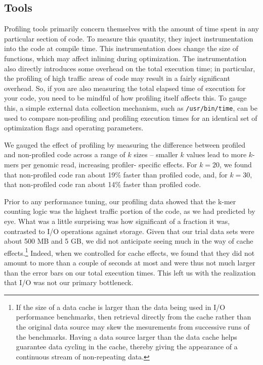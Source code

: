 \documentclass{article}
\begin{document}
\subsection{Tools}

Profiling tools primarily concern themselves with the amount of time spent in
any particular section of code. To measure this quantity, they inject
instrumentation into the code at compile time. This instrumentation does change
the size of functions, which may affect inlining during optimization.  The
instrumentation also directly introduces some overhead on the total execution
time; in particular, the profiling of high traffic areas of code may result in
a fairly significant overhead. So, if you are also measuring the total elapsed
time of execution for your code, you need to be mindful of how profiling itself
affects this. To gauge this, a simple external data collection mechanism, such
as \texttt{/usr/bin/time}, can be used to compare non-profiling and profiling
execution times for an identical set of optimization flags and operating
parameters.  

We gauged the effect of profiling by measuring the difference between
profiled and non-profiled code across a range of $k$ sizes -- smaller
$k$ values lead to more $k$-mers per genomic read, increasing
profiler- specific effects.  For $k = 20$, we found that non-profiled
code ran about 19\% faster than profiled code, and, for $k = 30$, that
non-profiled code ran about 14\% faster than profiled code.


Prior to any performance tuning, our profiling data showed that the k-mer
counting logic was the highest traffic portion of the code, as we had predicted
by eye. What was a little surprising was how significant of a fraction it was,
contrasted to I/O operations against storage. Given that our trial data sets
were about 500 MB and 5 GB, we did not anticipate seeing much in the way of
cache effects.\footnote{If the size of a data cache is larger than the data
being used in I/O performance benchmarks, then retrieval directly from the
cache rather than the original data source may skew the mesurements from
successive runs of the benchmarks. Having a data source larger than the data
cache helps guarantee data cycling in the cache, thereby giving the appearance
of a continuous stream of non-repeating data.} Indeed, when we controlled for
cache effects, we found that they did not amount to more than a couple of
seconds at most and were thus not much larger than the error bars on our total
execution times.  This left us with the realization that I/O was not our
primary bottleneck.
\end{document}
